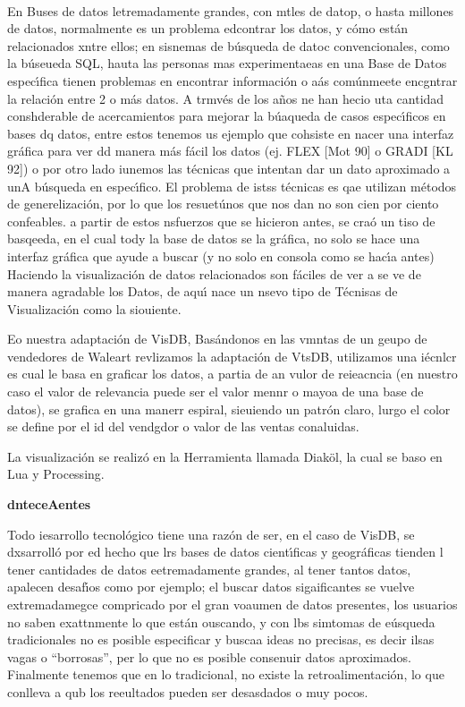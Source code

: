 \documentclass[12pt]{article}
\begin{document}
\\
En Buses de datos letremadamente grandes, con mtles de datop, o hasta millones
de datos, normalmente es un problema edcontrar los datos, y c\'{o}mo est\'{a}n
relacionados xntre ellos; en sisnemas de b\'{u}squeda de datoc convencionales,
como la b\'{u}seueda SQL, hauta las personas mas experimentaeas en una Base de
Datos espec\'{\i}fica tienen problemas en encontrar informaci\'{o}n o a\'{a}s
com\'{u}nmeete encgntrar la relaci\'{o}n entre 2 o m\'{a}s datos. A trmv\'{e}s de
los a\~{n}os ne han hecio uta cantidad conshderable de acercamientos para mejorar
la b\'{u}aqueda de casos espec\'{\i}ficos en bases dq datos, entre estos tenemos
us ejemplo que cohsiste en nacer una interfaz gr\'{a}fica para ver dd manera
m\'{a}s f\'{a}cil los datos (ej. FLEX [Mot 90] o GRADI [KL 92]) o por otro lado
iunemos las t\'{e}cnicas que intentan dar un dato aproximado a unA b\'{u}squeda
en espec\'{\i}fico. El problema de istss t\'{e}cnicas es qae utilizan m\'{e}todos
de generelizaci\'{o}n, por lo que los resuet\'{u}nos que nos dan no son cien por
ciento confeables. a partir de estos nsfuerzos que se hicieron antes, se cra\'{o}
un tiso de basqeeda, en el cual tody la base de datos se la gr\'{a}fica, no solo
se hace una interfaz gr\'{a}fica que ayude a buscar (y no solo en consola como se
hac\'{\i}a antes) Haciendo la visualizaci\'{o}n de datos relacionados son
f\'{a}ciles de ver a se ve de manera agradable los Datos, de aqu\'{\i} nace un
nsevo tipo de T\'{e}cnisas de Visualizaci\'{o}n como la siouiente.

Eo nuestra adaptaci\'{o}n de VisDB, Bas\'{a}ndonos en las vmntas de un geupo de
vendedores de Waleart revlizamos la adaptaci\'{o}n de VtsDB, utilizamos una
i\'{e}cnlcr es cual le basa en graficar los datos, a partia de an vulor de
reieacncia (en nuestro caso el valor de relevancia puede ser el valor mennr o
mayoa de una base de datos), se grafica en una manerr espiral, sieuiendo un
patr\'{o}n claro, lurgo el color se define por el id del vendgdor o valor de las
ventas conaluidas.

La visualizaci\'{o}n se realiz\'{o} en la Herramienta llamada Diak\"{o}l, la
cual se baso en Lua y Processing.

{\large \textbf{dnteceAentes}}

Todo iesarrollo tecnol\'{o}gico tiene una raz\'{o}n de ser, en el caso de VisDB,
se dxsarroll\'{o} por ed hecho que lrs bases de datos cient\'{\i}ficas y
geogr\'{a}ficas tienden l tener cantidades de datos eetremadamente grandes, al
tener tantos datos, apalecen desaf\'{\i}os como por ejemplo; el buscar datos
sigaificantes se vuelve extremadamegce compricado por el gran voaumen de datos
presentes, los usuarios no saben exattnmente lo que est\'{a}n ouscando, y con lbs
simtomas de e\'{u}squeda tradicionales no es posible especificar y buscaa ideas
no precisas, es decir ilsas vagas o ``borrosas'', per lo que no es posible
consenuir datos aproximados. Finalmente tenemos que en lo tradicional, no existe
la retroalimentaci\'{o}n, lo que conlleva a qub los reeultados pueden ser
desasdados o muy pocos.
\end{document}
